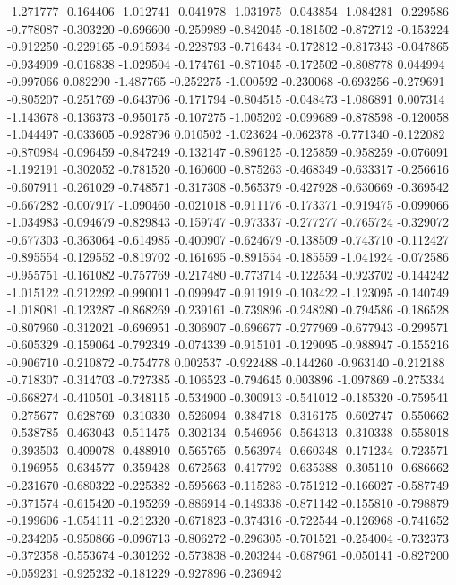-1.271777
-0.164406
-1.012741
-0.041978
-1.031975
-0.043854
-1.084281
-0.229586
-0.778087
-0.303220
-0.696600
-0.259989
-0.842045
-0.181502
-0.872712
-0.153224
-0.912250
-0.229165
-0.915934
-0.228793
-0.716434
-0.172812
-0.817343
-0.047865
-0.934909
-0.016838
-1.029504
-0.174761
-0.871045
-0.172502
-0.808778
0.044994
-0.997066
0.082290
-1.487765
-0.252275
-1.000592
-0.230068
-0.693256
-0.279691
-0.805207
-0.251769
-0.643706
-0.171794
-0.804515
-0.048473
-1.086891
0.007314
-1.143678
-0.136373
-0.950175
-0.107275
-1.005202
-0.099689
-0.878598
-0.120058
-1.044497
-0.033605
-0.928796
0.010502
-1.023624
-0.062378
-0.771340
-0.122082
-0.870984
-0.096459
-0.847249
-0.132147
-0.896125
-0.125859
-0.958259
-0.076091
-1.192191
-0.302052
-0.781520
-0.160600
-0.875263
-0.468349
-0.633317
-0.256616
-0.607911
-0.261029
-0.748571
-0.317308
-0.565379
-0.427928
-0.630669
-0.369542
-0.667282
-0.007917
-1.090460
-0.021018
-0.911176
-0.173371
-0.919475
-0.099066
-1.034983
-0.094679
-0.829843
-0.159747
-0.973337
-0.277277
-0.765724
-0.329072
-0.677303
-0.363064
-0.614985
-0.400907
-0.624679
-0.138509
-0.743710
-0.112427
-0.895554
-0.129552
-0.819702
-0.161695
-0.891554
-0.185559
-1.041924
-0.072586
-0.955751
-0.161082
-0.757769
-0.217480
-0.773714
-0.122534
-0.923702
-0.144242
-1.015122
-0.212292
-0.990011
-0.099947
-0.911919
-0.103422
-1.123095
-0.140749
-1.018081
-0.123287
-0.868269
-0.239161
-0.739896
-0.248280
-0.794586
-0.186528
-0.807960
-0.312021
-0.696951
-0.306907
-0.696677
-0.277969
-0.677943
-0.299571
-0.605329
-0.159064
-0.792349
-0.074339
-0.915101
-0.129095
-0.988947
-0.155216
-0.906710
-0.210872
-0.754778
0.002537
-0.922488
-0.144260
-0.963140
-0.212188
-0.718307
-0.314703
-0.727385
-0.106523
-0.794645
0.003896
-1.097869
-0.275334
-0.668274
-0.410501
-0.348115
-0.534900
-0.300913
-0.541012
-0.185320
-0.759541
-0.275677
-0.628769
-0.310330
-0.526094
-0.384718
-0.316175
-0.602747
-0.550662
-0.538785
-0.463043
-0.511475
-0.302134
-0.546956
-0.564313
-0.310338
-0.558018
-0.393503
-0.409078
-0.488910
-0.565765
-0.563974
-0.660348
-0.171234
-0.723571
-0.196955
-0.634577
-0.359428
-0.672563
-0.417792
-0.635388
-0.305110
-0.686662
-0.231670
-0.680322
-0.225382
-0.595663
-0.115283
-0.751212
-0.166027
-0.587749
-0.371574
-0.615420
-0.195269
-0.886914
-0.149338
-0.871142
-0.155810
-0.798879
-0.199606
-1.054111
-0.212320
-0.671823
-0.374316
-0.722544
-0.126968
-0.741652
-0.234205
-0.950866
-0.096713
-0.806272
-0.296305
-0.701521
-0.254004
-0.732373
-0.372358
-0.553674
-0.301262
-0.573838
-0.203244
-0.687961
-0.050141
-0.827200
-0.059231
-0.925232
-0.181229
-0.927896
-0.236942
